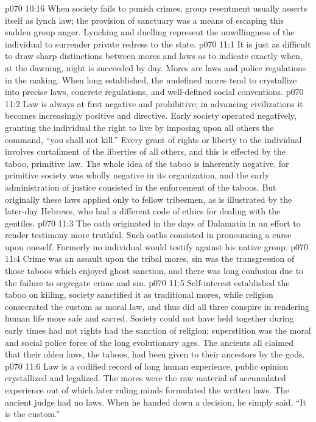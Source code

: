 \vs p070 10:16 When society fails to punish crimes, group resentment usually asserts itself as lynch law; the provision of sanctuary was a means of escaping this sudden group anger. Lynching and duelling represent the unwillingness of the individual to surrender private redress to the state.
\vs p070 11:1 It is just as difficult to draw sharp distinctions between mores and laws as to indicate exactly when, at the dawning, night is succeeded by day. Mores are laws and police regulations in the making. When long established, the undefined mores tend to crystallize into precise laws, concrete regulations, and well\hyp{}defined social conventions.
\vs p070 11:2 Law is always at first negative and prohibitive; in advancing civilizations it becomes increasingly positive and directive. Early society operated negatively, granting the individual the right to live by imposing upon all others the command, “you shall not kill.” Every grant of rights or liberty to the individual involves curtailment of the liberties of all others, and this is effected by the taboo, primitive law. The whole idea of the taboo is inherently negative, for primitive society was wholly negative in its organization, and the early administration of justice consisted in the enforcement of the taboos. But originally these laws applied only to fellow tribesmen, as is illustrated by the later\hyp{}day Hebrews, who had a different code of ethics for dealing with the gentiles.
\vs p070 11:3 The oath originated in the days of Dalamatia in an effort to render testimony more truthful. Such oaths consisted in pronouncing a curse upon oneself. Formerly no individual would testify against his native group.
\vs p070 11:4 \pc Crime was an assault upon the tribal mores, sin was the transgression of those taboos which enjoyed ghost sanction, and there was long confusion due to the failure to segregate crime and sin.
\vs p070 11:5 Self\hyp{}interest established the taboo on killing, society sanctified it as traditional mores, while religion consecrated the custom as moral law, and thus did all three conspire in rendering human life more safe and sacred. Society could not have held together during early times had not rights had the sanction of religion; superstition was the moral and social police force of the long evolutionary ages. The ancients all claimed that their olden laws, the taboos, had been given to their ancestors by the gods.
\vs p070 11:6 Law is a codified record of long human experience, public opinion crystallized and legalized. The mores were the raw material of accumulated experience out of which later ruling minds formulated the written laws. The ancient judge had no laws. When he handed down a decision, he simply said, “It is the custom.”
